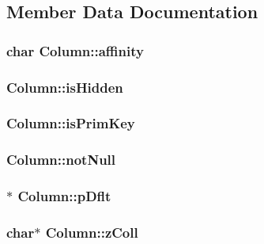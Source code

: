 \subsection{Member Data Documentation}
\hypertarget{struct_column_ac9d6fe31c45888cecaf3f5ad5b93bf23}{
\subsubsection[{affinity}]{\setlength{\rightskip}{0pt plus 5cm}char Column\-::affinity}}\label{struct_column_ac9d6fe31c45888cecaf3f5ad5b93bf23}
\hypertarget{struct_column_aafdb39efd9b21476415c5beeb5a8b180}{
\subsubsection[{is\-Hidden}]{ Column\-::is\-Hidden}}\label{struct_column_aafdb39efd9b21476415c5beeb5a8b180}
\hypertarget{struct_column_a57a53c2c60925a1ce5fdfe8fa3ccd62a}{
\subsubsection[{is\-Prim\-Key}]{ Column\-::is\-Prim\-Key}}\label{struct_column_a57a53c2c60925a1ce5fdfe8fa3ccd62a}
\hypertarget{struct_column_a852e9a4c1c327a64d9b051dcafda3841}{
\subsubsection[{not\-Null}]{ Column\-::not\-Null}}\label{struct_column_a852e9a4c1c327a64d9b051dcafda3841}
\hypertarget{struct_column_ac4178f302df70048235660979f84ffe4}{
\subsubsection[{p\-Dflt}]{$\ast$ Column\-::p\-Dflt}}\label{struct_column_ac4178f302df70048235660979f84ffe4}
\hypertarget{struct_column_aa95909d5c77b321258622ed28d7b96eb}{
\subsubsection[{z\-Coll}]{\setlength{\rightskip}{0pt plus 5cm}char$\ast$ Column\-::z\-Coll}}\label{struct_column_aa95909d5c77b321258622ed28d7b96eb}
